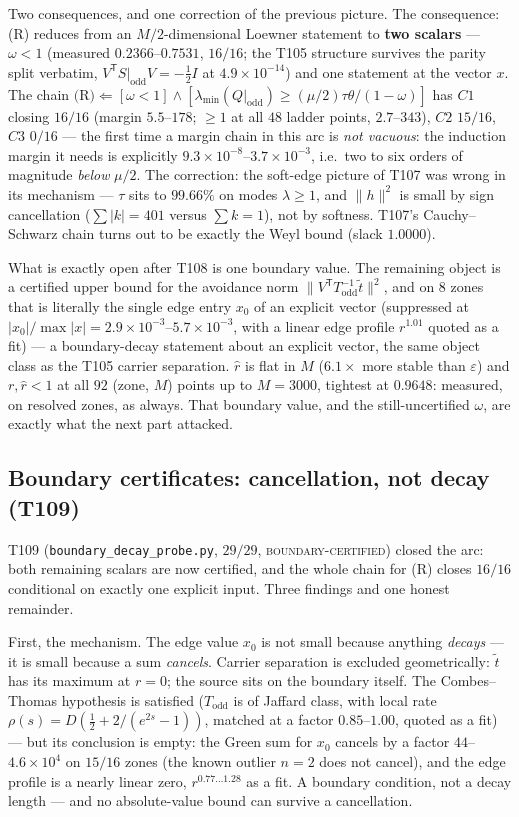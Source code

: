 \documentclass[11pt,a4paper]{article}
\begin{document}
Two consequences, and one correction of the previous picture. The consequence: (R) reduces from an
$M/2$-dimensional Loewner statement to \textbf{two scalars} --- $\omega<1$ (measured
$0.2366$--$0.7531$, $16/16$; the T105 structure survives the parity split verbatim,
$V^{\mathsf T}S|_{\mathrm{odd}}V=-\tfrac12 I$ at $4.9\times10^{-14}$) and one statement at the vector
$x$. The chain $\text{(R)}\Leftarrow[\omega<1]\wedge[\lambda_{\min}(Q|_{\mathrm{odd}})\ge
(\mu/2)\tau\theta/(1-\omega)]$ has $C1$ closing $16/16$ (margin $5.5$--$178$; $\ge1$ at all $48$ ladder
points, $2.7$--$343$), $C2$ $15/16$, $C3$ $0/16$ --- the first time a margin chain in this arc is
\emph{not vacuous}: the induction margin it needs is explicitly $9.3\times10^{-8}$--$3.7\times10^{-3}$,
i.e.\ two to six orders of magnitude \emph{below} $\mu/2$. The correction: the soft-edge picture of T107
was wrong in its mechanism --- $\tau$ sits to $99.66\%$ on modes $\lambda\ge1$, and $\|h\|^2$ is small by
sign cancellation ($\sum|k|=401$ versus $\sum k=1$), not by softness. T107's Cauchy--Schwarz chain turns
out to be exactly the Weyl bound (slack $1.0000$).

What is exactly open after T108 is one boundary value. The remaining object is a certified upper bound
for the avoidance norm $\|V^{\mathsf T}T_{\mathrm{odd}}^{-1}\tilde t\|^2$, and on $8$ zones that is
literally the single edge entry $x_0$ of an explicit vector (suppressed at
$|x_0|/\max|x|=2.9\times10^{-3}$--$5.7\times10^{-3}$, with a linear edge profile $r^{1.01}$ quoted as a
fit) --- a boundary-decay statement about an explicit vector, the same object class as the T105 carrier
separation. $\hat r$ is flat in $M$ ($6.1\times$ more stable than $\varepsilon$) and $r,\hat r<1$ at all
$92$ (zone, $M$) points up to $M=3000$, tightest at $0.9648$: measured, on resolved zones, as always.
That boundary value, and the still-uncertified $\omega$, are exactly what the next part attacked.

\subsection{Boundary certificates: cancellation, not decay (T109)}
T109 (\texttt{boundary\_decay\_probe.py}, $29/29$, \textsc{boundary-certified}) closed the arc: both
remaining scalars are now certified, and the whole chain for (R) closes $16/16$ conditional on exactly
one explicit input. Three findings and one honest remainder.

First, the mechanism. The edge value $x_0$ is not small because anything \emph{decays} --- it is small
because a sum \emph{cancels}. Carrier separation is excluded geometrically: $\tilde t$ has its maximum
at $r=0$; the source sits on the boundary itself. The Combes--Thomas hypothesis is satisfied
($T_{\mathrm{odd}}$ is of Jaffard class, with local rate $\rho(s)=D(\tfrac12+2/(e^{2s}-1))$, matched at
a factor $0.85$--$1.00$, quoted as a fit) --- but its conclusion is empty: the Green sum for $x_0$
cancels by a factor $44$--$4.6\times10^{4}$ on $15/16$ zones (the known outlier $n=2$ does not cancel),
and the edge profile is a nearly linear zero, $r^{0.77\ldots1.28}$ as a fit. A boundary condition, not
a decay length --- and no absolute-value bound can survive a cancellation.
\end{document}
